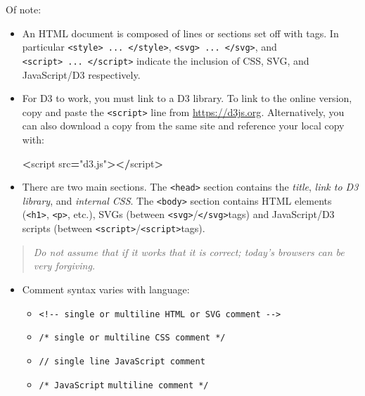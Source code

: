 \documentclass[
  openany]{book}
\newenvironment{Shaded}{\begin{snugshade}}{\end{snugshade}}
\newcommand{\NormalTok}[1]{#1}
\newcommand{\OperatorTok}[1]{\textcolor[rgb]{0.81,0.36,0.00}{\textbf{#1}}}
\newcommand{\StringTok}[1]{\textcolor[rgb]{0.31,0.60,0.02}{#1}}
\begin{document}
Of note:

\begin{itemize}
\item
  An HTML document is composed of lines or sections set off with tags. In particular \texttt{\textless{}style\textgreater{}\ ...\ \textless{}/style\textgreater{}}, \texttt{\textless{}svg\textgreater{}\ ...\ \textless{}/svg\textgreater{}}, and \texttt{\textless{}script\textgreater{}\ ...\ \textless{}/script\textgreater{}} indicate the inclusion of CSS, SVG, and JavaScript/D3 respectively.
\item
  For D3 to work, you must link to a D3 library. To link to the online version, copy and paste the \texttt{\textless{}script\textgreater{}} line from \url{https://d3js.org}. Alternatively, you can also download a copy from the same site and reference your local copy with:

\begin{Shaded}
\begin{Highlighting}[]
\OperatorTok{\textless{}}\NormalTok{script src}\OperatorTok{=}\StringTok{"d3.js"}\OperatorTok{\textgreater{}\textless{}/}\NormalTok{script}\OperatorTok{\textgreater{}}
\end{Highlighting}
\end{Shaded}
\item
  There are two main sections. The \texttt{\textless{}head\textgreater{}} section contains the \emph{title}, \emph{link to D3 library}, and \emph{internal CSS}. The \texttt{\textless{}body\textgreater{}} section contains HTML elements (\texttt{\textless{}h1\textgreater{}}, \texttt{\textless{}p\textgreater{}}, etc.), SVGs (between \texttt{\textless{}svg\textgreater{}}/\texttt{\textless{}/svg\textgreater{}}tags) and JavaScript/D3 scripts (between \texttt{\textless{}script\textgreater{}}/\texttt{\textless{}script\textgreater{}}tags).
\end{itemize}

\begin{quote}
\emph{Do not assume that if it works that it is correct; today's browsers can be very forgiving.}
\end{quote}

\begin{itemize}
\item
  Comment syntax varies with language:

  \begin{itemize}
  \item
    \texttt{\textless{}!-\/-\ single\ or\ multiline\ HTML\ or\ SVG\ comment\ -\/-\textgreater{}}
  \item
    \texttt{/*\ single\ or\ multiline\ CSS\ comment\ */}
  \item
    \texttt{//\ single\ line\ JavaScript\ comment}
  \item
    \texttt{/*\ JavaScript} \texttt{multiline\ comment\ */}
  \end{itemize}
\end{itemize}
\end{document}
